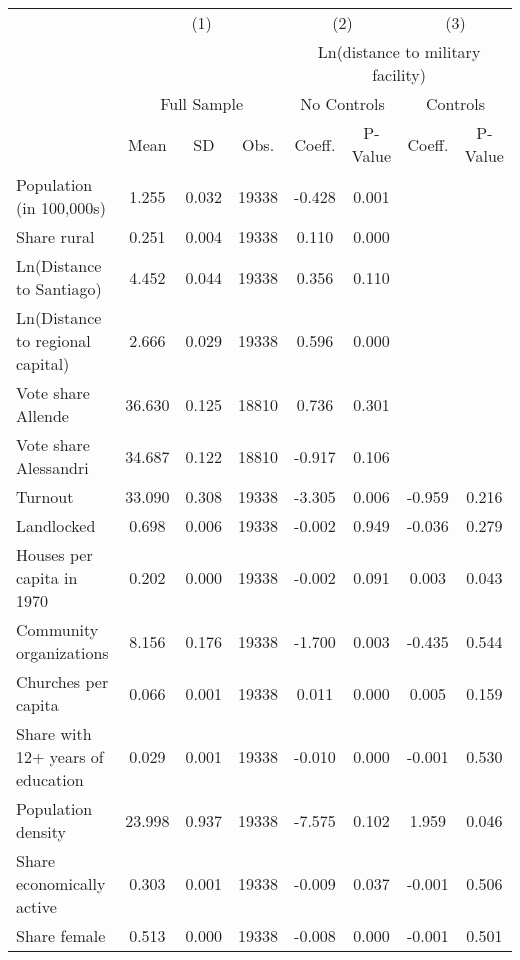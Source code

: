
\begin{tabular}{l*{7}{c}}
\hline\hline
 & \multicolumn{3}{c}{(1)} & \multicolumn{2}{c}{(2)} & \multicolumn{2}{c}{(3)} \\
 & & & & \multicolumn{4}{c}{Ln(distance to military facility)} \\
 & \multicolumn{3}{c}{Full Sample} & \multicolumn{2}{c}{No Controls} & \multicolumn{2}{c}{Controls} \\
 & Mean & SD & Obs. & Coeff. & P-Value & Coeff. & P-Value \\
\hline
Population (in 100,000s) &     1.255 &     0.032 & 19338 &    -0.428 & 0.001\sym{**} &  &  \\
Share rural &     0.251 &     0.004 & 19338 &     0.110 & 0.000\sym{***} &  &  \\
Ln(Distance to Santiago) &     4.452 &     0.044 & 19338 &     0.356 & 0.110  &  &  \\
Ln(Distance to regional capital) &     2.666 &     0.029 & 19338 &     0.596 & 0.000\sym{***} &  &  \\
Vote share Allende &    36.630 &     0.125 & 18810 &     0.736 & 0.301  &  &  \\
Vote share Alessandri &    34.687 &     0.122 & 18810 &    -0.917 & 0.106  &  &  \\
Turnout &    33.090 &     0.308 & 19338 &    -3.305 & 0.006\sym{**} &    -0.959 & 0.216  \\
Landlocked &     0.698 &     0.006 & 19338 &    -0.002 & 0.949  &    -0.036 & 0.279  \\
Houses per capita in 1970 &     0.202 &     0.000 & 19338 &    -0.002 & 0.091  &     0.003 & 0.043\sym{*} \\
Community organizations &     8.156 &     0.176 & 19338 &    -1.700 & 0.003\sym{**} &    -0.435 & 0.544  \\
Churches per capita &     0.066 &     0.001 & 19338 &     0.011 & 0.000\sym{***} &     0.005 & 0.159  \\
Share with 12+ years of education &     0.029 &     0.001 & 19338 &    -0.010 & 0.000\sym{***} &    -0.001 & 0.530  \\
Population density &    23.998 &     0.937 & 19338 &    -7.575 & 0.102  &     1.959 & 0.046\sym{*} \\
Share economically active &     0.303 &     0.001 & 19338 &    -0.009 & 0.037\sym{*} &    -0.001 & 0.506  \\
Share female &     0.513 &     0.000 & 19338 &    -0.008 & 0.000\sym{***} &    -0.001 & 0.501  \\

\end{tabular}
